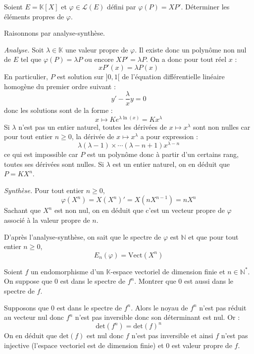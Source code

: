 \documentclass[a4paper,10pt]{report}
\begin{document}
\begin{Exa} Soient $E = \mathbb{K}[X]$ et $\varphi \in \mathcal{L}(E)$ défini par $\varphi(P)=XP'$. Déterminer les éléments propres de $\varphi$.
\end{Exa}

\corr Raisonnons par analyse-synthèse. 

\medskip

\noindent \textit{Analyse.} Soit $\lambda \in \mathbb{K}$ une valeur propre de $\varphi$. Il existe donc un polynôme non nul de $E$ tel que $\varphi(P)=\lambda P$ ou encore $XP' = \lambda P$. On a donc pour tout réel $x$ :
$$ x P'(x) = \lambda P(x)$$
En particulier, $P$ est solution sur $]0,1[$ de l'équation différentielle linéaire homogène du premier ordre suivant :
$$ y' - \dfrac{\lambda}{x} y = 0$$
donc les solutions sont de la forme :
$$ x \mapsto K e^{\lambda \ln(x)} = K x^{\lambda}$$
Si $\lambda$ n'est pas un entier naturel, toutes les dérivées de $x \mapsto x^{\lambda}$ sont non nulles car pour tout entier $n \geq 0$, la dérivée de $x \mapsto x^{\lambda}$ a pour expression :
$$ \lambda (\lambda-1) \times \cdots (\lambda-n+1) x^{\lambda -n}$$
ce qui est impossible car $P$ est un polynôme donc à partir d'un certains rang, toutes ses dérivées sont nulles. Si $\lambda$ est un entier naturel, on en déduit que $P= K X^n$.

\medskip

\noindent \textit{Synthèse.} Pour tout entier $n \geq 0$,
$$ \varphi(X^n) = X(X^n)'=X(nX^{n-1})=nX^n$$
Sachant que $X^n$ est non nul, on en déduit que c'est un vecteur propre de $\varphi$ associé à la valeur propre de $n$.

\medskip

\noindent D'après l'analyse-synthèse, on sait que le spectre de $\varphi$ est $\mathbb{N}$ et que pour tout entier $n \geq 0$,
$$ E_{n}(\varphi) = \textrm{Vect}(X^n)$$

\begin{Exa} Soient $f$ un endomorphisme d'un $\mathbb{K}$-espace vectoriel de dimension finie et $n \in \mathbb{N}^{*}$. On suppose que $0$ est dans le spectre de $f^n$. Montrer que $0$ est aussi dans le spectre de $f$.
\end{Exa}

\corr Supposons que $0$ est dans le spectre de $f^n$. Alors le noyau de $f^n$ n'est pas réduit au vecteur nul donc $f^n$ n'est pas inversible donc son déterminant est nul. Or :
$$ \textrm{det}(f^n) = \textrm{det}(f)^n$$
On en déduit que $\textrm{det}(f)$ est nul donc $f$ n'est pas inversible et ainsi $f$ n'est pas injective (l'espace vectoriel est de dimension finie) et $0$ est valeur propre de $f$.
\end{document}
